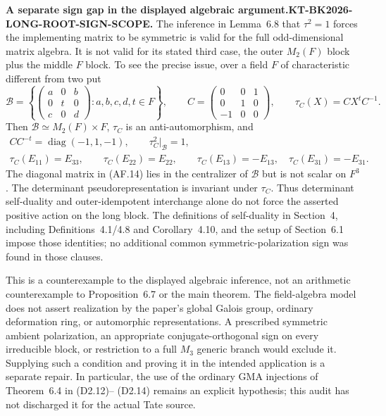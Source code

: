 \documentclass[11pt,a4paper]{article}
\theoremstyle{definition}
\renewcommand{\paragraph}[1]{\par\smallskip\noindent\textbf{#1}\quad\ignorespaces}
\begin{document}
\paragraph{A separate sign gap in the displayed algebraic argument.}\textbf{KT-BK2026-LONG-ROOT-SIGN-SCOPE.} 
The inference in Lemma~6.8 that $\tau^2=1$ forces the implementing
matrix to be symmetric is valid for the full odd-dimensional matrix
algebra.  It is not valid for its stated third case, the outer
$M_2(F)$ block plus the middle $F$ block.  To see the precise issue,
over a field $F$ of characteristic different from two put
\[
 \mathcal B=
 \left\{\begin{pmatrix}a&0&b\\0&t&0\\c&0&d\end{pmatrix}
           :a,b,c,d,t\in F\right\},\qquad
 C=\begin{pmatrix}0&0&1\\0&1&0\\-1&0&0\end{pmatrix},
 \qquad \tau_C(X)=CX^tC^{-1}.                                \tag{AF.13}
\]
Then $\mathcal B\simeq M_2(F)\times F$, $\tau_C$ is an
anti-automorphism, and
\[
 \begin{gathered}
 C C^{-t}=\operatorname{diag}(-1,1,-1),\qquad
 \tau_C^2|_{\mathcal B}=1,\\
 \tau_C(E_{11})=E_{33},\qquad \tau_C(E_{22})=E_{22},\qquad
 \tau_C(E_{13})=-E_{13},\quad \tau_C(E_{31})=-E_{31}.
 \end{gathered}                                               \tag{AF.14}
\]
The diagonal matrix in (AF.14) lies in the centralizer of
$\mathcal B$ but is not scalar on $F^3$.  The determinant
pseudorepresentation is invariant under $\tau_C$.  Thus
determinant self-duality and outer-idempotent interchange alone
do not force the asserted positive action on the long block.
The definitions of self-duality in Section~4, including
Definitions~4.1/4.8 and Corollary~4.10, and the setup of
Section~6.1 impose those identities; no additional common
symmetric-polarization sign was found in those clauses.

This is a counterexample to the displayed algebraic inference,
not an arithmetic counterexample to Proposition~6.7 or the main
theorem.  The field-algebra model does not assert realization by
the paper's global Galois group, ordinary deformation ring, or
automorphic representations.  A prescribed symmetric ambient
polarization, an appropriate conjugate-orthogonal sign on every
irreducible block, or restriction to a full $M_3$ generic branch
would exclude it.  Supplying such a condition and proving it in
the intended application is a separate repair.  In particular,
the use of the ordinary GMA injections of Theorem~6.4 in (D2.12)--
(D2.14) remains an explicit hypothesis; this audit has not
discharged it for the actual Tate source.
\end{document}
